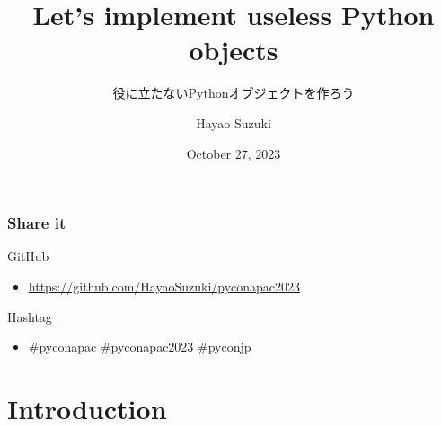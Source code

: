 \documentclass[aspectratio=169,dvipdfmx,14pt,notheorems]{beamer}
\title{Let's implement useless Python objects}
\subtitle{役に立たないPythonオブジェクトを作ろう}
\author[Hayao]{Hayao Suzuki}
\institute[PyCon APAC 2023]{PyCon APAC 2023}
\date{October 27, 2023}
\theoremstyle{definition}
\begin{document}
\begin{frame}[plain]\frametitle{}
\titlepage %
\end{frame}

\begin{frame}\frametitle{Share it}

\begin{block}{GitHub}
\begin{itemize}
\item \url{https://github.com/HayaoSuzuki/pyconapac2023}
\end{itemize}
\end{block}

\begin{block}{Hashtag}
\begin{itemize}
\item \#pyconapac \#pyconapac2023 \#pyconjp
\end{itemize}
\end{block}

\end{frame}

\section{Introduction}
\end{document}
